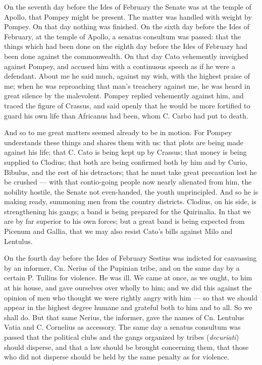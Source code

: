  On the seventh day before the Ides of February the Senate was at the temple of Apollo, that Pompey might be present. The matter was handled with weight by Pompey. On that day nothing was finished. On the sixth day before the Ides of February, at the temple of Apollo, a senatus consultum was passed: that the things which had been done on the eighth day before the Ides of February had been done against the commonwealth. On that day Cato vehemently inveighed against Pompey, and accused him with a continuous speech as if he were a defendant. About me he said much, against my wish, with the highest praise of me; when he was reproaching that man's treachery against me, he was heard in great silence by the malevolent. Pompey replied vehemently against him, and traced the figure of Crassus, and said openly that he would be more fortified to guard his own life than Africanus had been, whom C. Carbo had put to death.

 And so to me great matters seemed already to be in motion. For Pompey understands these things and shares them with us: that plots are being made against his life; that C. Cato is being kept up by Crassus; that money is being supplied to Clodius; that both are being confirmed both by him and by Curio, Bibulus, and the rest of his detractors; that he must take great precaution lest he be crushed --- with that contio-going people now nearly alienated from him, the nobility hostile, the Senate not even-handed, the youth unprincipled. And so he is making ready, summoning men from the country districts. Clodius, on his side, is strengthening his gangs; a band is being prepared for the Quirinalia. In that we are by far superior to his own forces; but a great band is being expected from Picenum and Gallia, that we may also resist Cato's bills against Milo and Lentulus.

 On the fourth day before the Ides of February Sestius was indicted for canvassing by an informer, Cn. Nerius of the Pupinian tribe, and on the same day by a certain P. Tullius for violence. He was ill. We came at once, as we ought, to him at his house, and gave ourselves over wholly to him; and we did this against the opinion of men who thought we were rightly angry with him --- so that we should appear in the highest degree humane and grateful both to him and to all. So we shall do. But that same Nerius, the informer, gave the names of Cn. Lentulus Vatia and C. Cornelius as accessory. The same day a senatus consultum was passed that the political clubs and the gangs organized by tribes (\textit{decuriati}) should disperse, and that a law should be brought concerning them, that those who did not disperse should be held by the same penalty as for violence.

